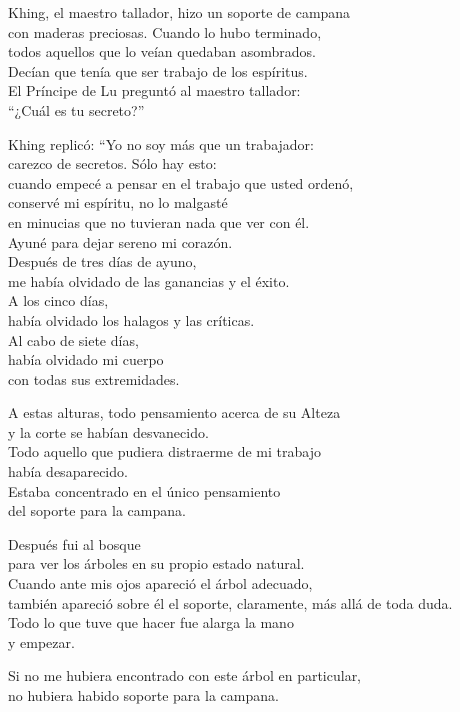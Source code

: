 \documentclass[hidelinks]{memoir}
\begin{document}
	Khing, el maestro tallador, hizo un soporte de campana\\
	con maderas preciosas. Cuando lo hubo terminado,\\
	todos aquellos que lo veían quedaban asombrados.\\
	Decían que tenía que ser trabajo de los espíritus.\\
	El Príncipe de Lu preguntó al maestro tallador:\\
	``¿Cuál es tu secreto?''
	
	Khing replicó: ``Yo no soy más que un trabajador:\\
	carezco de secretos. Sólo hay esto:\\
	cuando empecé a pensar en el trabajo que usted ordenó,\\
	conservé mi espíritu, no lo malgasté\\
	en minucias que no tuvieran nada que ver con él.\\
	Ayuné para dejar sereno mi corazón.\\
	Después de tres días de ayuno,\\
	me había olvidado de las ganancias y el éxito.\\
	A los cinco días,\\
	había olvidado los halagos y las críticas.\\
	Al cabo de siete días,\\
	había olvidado mi cuerpo\\
	con todas sus extremidades.
	
	A estas alturas, todo pensamiento acerca de su Alteza\\
	y la corte se habían desvanecido.\\
	Todo aquello que pudiera distraerme de mi trabajo\\
	había desaparecido.\\
	Estaba concentrado en el único pensamiento\\
	del soporte para la campana.
	
	Después fui al bosque\\
	para ver los árboles en su propio estado natural.\\
	Cuando ante mis ojos apareció el árbol adecuado,\\
	también apareció sobre él el soporte, claramente, más allá de toda
	duda.\\
	Todo lo que tuve que hacer fue alarga la mano\\
	y empezar.
	
	Si no me hubiera encontrado con este árbol en particular,\\
	no hubiera habido soporte para la campana.
	
\end{document}
